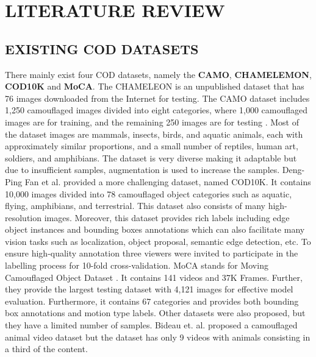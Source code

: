\documentclass[conference]{IEEEtran}
\begin{document}
\section{LITERATURE REVIEW}
\subsection{EXISTING COD DATASETS}
There mainly exist four COD datasets, namely the \textbf{CAMO}, \textbf{CHAMELEMON}, \textbf{COD10K} and \textbf{MoCA}. The CHAMELEON is an unpublished dataset that has 76 images downloaded from the Internet for testing. The CAMO dataset  includes 1,250 camouflaged images divided into eight categories, where 1,000 camouflaged images are for training, and the remaining 250 images are for testing \cite{le2019anabranch}. Most of the dataset images are mammals, insects, birds, and aquatic animals, each with approximately similar proportions, and a small number of reptiles, human art, soldiers, and amphibians. The dataset is very diverse making it adaptable but due to insufficient samples, augmentation is used to increase the samples. Deng-Ping Fan et al. \cite{9156837}  provided a more challenging dataset, named COD10K.
It contains 10,000 images divided into 78 camouflaged object categories such as aquatic, flying, amphibians, and terrestrial. This dataset also consists of many high-resolution images. Moreover, this dataset provides rich labels including edge object instances and bounding boxes annotations which can also facilitate many vision tasks such as localization, object proposal, semantic edge detection, etc. To ensure high-quality annotation three viewers were invited to participate in the labelling process for 10-fold cross-validation. MoCA stands for Moving Camouflaged Object Dataset \cite{DBLP:journals/corr/abs-2011-11630}. It contains 141 videos and 37K Frames. Further, they provide the largest testing dataset with 4,121 images for effective model evaluation. Furthermore, it contains 67 categories and provides both bounding box annotations and motion type labels. Other datasets were also  proposed, but they have a limited number of samples. Bideau et. al. \cite{DBLP:journals/corr/BideauL16} proposed a camouflaged animal video dataset but the dataset has only 9 videos with animals consisting in a third of the content.
\end{document}
